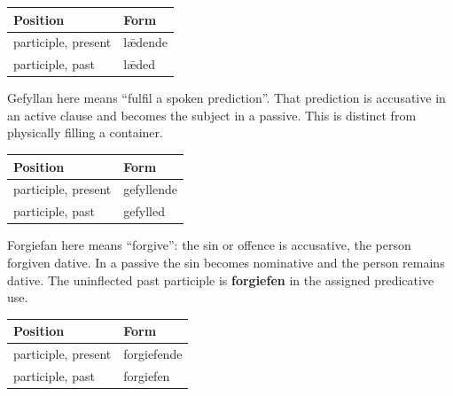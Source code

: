 \par\begingroup
\fontsize{10.5}{13.2}\selectfont
\setlength{\LTleft}{0pt}\setlength{\LTright}{\fill}
\noindent
\begin{tabular}{@{}>{\raggedright\arraybackslash}p{71.92mm}>{\raggedright\arraybackslash}p{49.26mm}@{}}
\toprule
\textbf{Position} & \textbf{Form} \\
\midrule
participle, present & lǣdende \\
participle, past & lǣded \\
\bottomrule
\end{tabular}
\par\endgroup

Gefyllan here means “fulfil a spoken prediction”. That prediction is accusative in an active clause and becomes the subject in a passive. This is distinct from physically filling a container.

\par\begingroup
\fontsize{10.5}{13.2}\selectfont
\setlength{\LTleft}{0pt}\setlength{\LTright}{\fill}
\noindent
\begin{tabular}{@{}>{\raggedright\arraybackslash}p{71.92mm}>{\raggedright\arraybackslash}p{49.26mm}@{}}
\toprule
\textbf{Position} & \textbf{Form} \\
\midrule
participle, present & gefyllende \\
participle, past & gefylled \\
\bottomrule
\end{tabular}
\par\endgroup

Forgiefan here means “forgive”: the sin or offence is accusative, the person forgiven dative. In a passive the sin becomes nominative and the person remains dative. The uninflected past participle is \textbf{forgiefen} in the assigned predicative use.

\par\begingroup
\fontsize{10.5}{13.2}\selectfont
\setlength{\LTleft}{0pt}\setlength{\LTright}{\fill}
\noindent
\begin{tabular}{@{}>{\raggedright\arraybackslash}p{69.12mm}>{\raggedright\arraybackslash}p{52.07mm}@{}}
\toprule
\textbf{Position} & \textbf{Form} \\
\midrule
participle, present & forgiefende \\
participle, past & forgiefen \\
\bottomrule
\end{tabular}
\par\endgroup


